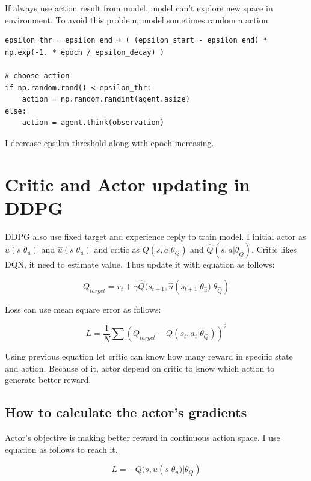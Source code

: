 \documentclass[12pt]{article}
\begin{document}
If always use action result from model, model can't explore new space in environment. To avoid this problem, model sometimes random a action.

\begin{verbatim}
epsilon_thr = epsilon_end + ( (epsilon_start - epsilon_end) * np.exp(-1. * epoch / epsilon_decay) )

# choose action
if np.random.rand() < epsilon_thr:
    action = np.random.randint(agent.asize)
else:
    action = agent.think(observation)
\end{verbatim}

I decrease epsilon threshold along with epoch increasing.

\section{Critic and Actor updating in DDPG}

DDPG also use fixed target and experience reply to train model. I initial actor as $u(s|\theta_u)$ and $\hat{u}(s | \theta_{\hat{u}})$ and critic as $Q(s, a | \theta_Q)$ and $\hat{Q}(s, a|\theta_{\hat{Q}})$. Critic likes DQN, it need to estimate value. Thus update it with equation as follows:

\begin{equation}
    Q_{target} = r_t + \gamma \hat{Q}(s_{t+1}, \hat{u}(s_{t+1}|\theta_{\hat{u}}) | \theta_{\hat{Q}})
\end{equation}

Loss can use mean square error as follows:

\begin{equation}
    L = \frac{1}{N} \sum (Q_{target} - Q(s_t, a_t | \theta_Q))^2
\end{equation}

Using previous equation let critic can know how many reward in specific state and action. Because of it, actor depend on critic to know which action to generate better reward. 

\subsection{How to calculate the actor's gradients}

Actor's objective is making better reward in continuous action space. I use equation as follows to reach it.

\begin{equation}
    L = - Q(s, u(s | \theta_u) | \theta_Q)
\end{equation}
\end{document}
